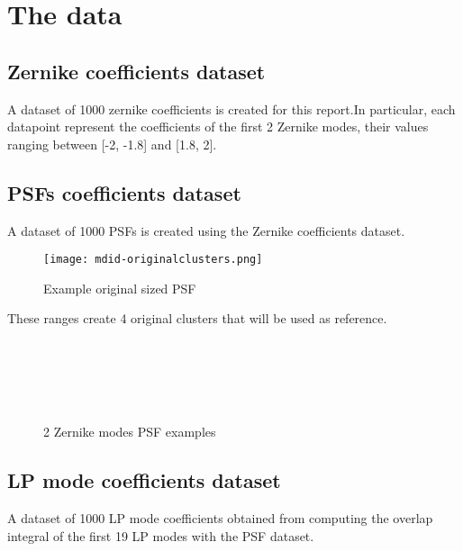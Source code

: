 \section{The data}

	\subsection{Zernike coefficients dataset}
			A dataset of 1000 zernike coefficients is created for this report.In particular, each datapoint represent the coefficients of the first 2 Zernike modes, their values ranging between [-2, -1.8] and [1.8, 2].\\
		
	\subsection{PSFs coefficients dataset}
		
		A dataset of 1000 PSFs is created using the Zernike coefficients dataset.\\
		
		\begin{figure}[ht!]
			\centering
			\texttt{[image: mdid-originalclusters.png]}
			\caption{Example original sized PSF}\hspace{\fill}
		\end{figure}
		
		These ranges create 4 original clusters that will be used as reference.
		
		\begin{figure*}[ht!]
			\centering
			\\
					
			\\
					
			\\
					
			\\
			\caption{2 Zernike modes PSF examples}
		\end{figure*}
		
		\FloatBarrier
		
	\subsection{LP mode coefficients dataset}
		A dataset of 1000 LP mode coefficients obtained from computing the overlap integral of the first 19 LP modes with the PSF dataset.
		